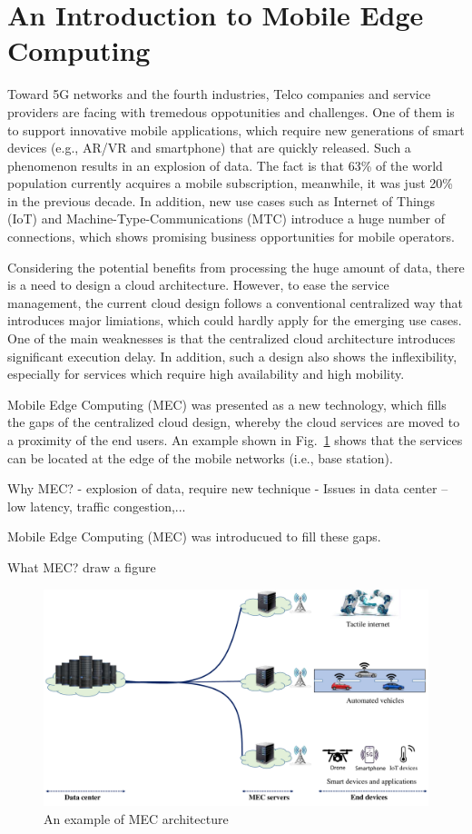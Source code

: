\section{An Introduction to Mobile Edge Computing}  \label{intro}


Toward 5G networks and the fourth industries, Telco companies and service providers are facing with tremedous oppotunities and challenges. One of them is to support innovative mobile applications, which require new generations of smart devices (e.g., AR/VR and smartphone) that are quickly released. Such a phenomenon results in an explosion of data. The fact is that 63\% of the world population currently acquires a mobile subscription, meanwhile, it was just 20\% in the previous decade. In addition, new use cases such as Internet of Things (IoT) and Machine-Type-Communications (MTC) introduce a huge number of connections, which shows promising business opportunities for mobile operators.

Considering the potential benefits from processing the huge amount of data, there is a need to design a cloud architecture. However, to ease the service management, the current cloud design follows a conventional centralized way that introduces major limiations, which could hardly apply for the emerging use cases. One of the main weaknesses is that the centralized cloud architecture introduces significant execution delay. In addition, such a design also shows the inflexibility, especially for services which require high availability and high mobility. 

Mobile Edge Computing (MEC) was presented as a new technology, which fills the gaps of the centralized cloud design, whereby the cloud services are moved to a proximity of the end users. An example shown  in Fig.~\ref{fig:mec-arch} shows that the services can be located at the edge of the mobile networks (i.e., base station). 

Why MEC? 
  - explosion of data, require new technique
  - Issues in data center -- low latency, traffic congestion,...

Mobile Edge Computing (MEC) was introducued to fill these gaps.

What MEC? draw a figure


\begin{figure}[H]
  \begin{center}
   \includegraphics[width=13cm]{./figures/mec-arch.pdf}
   \caption{An example of MEC architecture}
   \label{fig:mec-arch}
   \end{center}
\end{figure}

